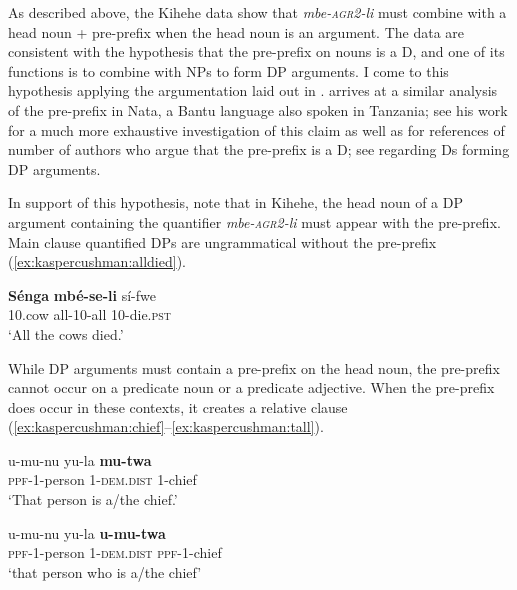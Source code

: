 \documentclass[output=paper,modfonts,nonflat]{langsci/langscibook}
\begin{document}
As described above, the Kihehe data show that \textit{mbe-\textsc{agr2}-li} must combine with a head noun + pre-prefix when the head noun is an argument. The data are consistent with the hypothesis that the pre-prefix on nouns is a D, and one of its functions is to combine with NPs to form DP arguments. I come to this hypothesis applying the argumentation laid out in \citealt{matthewson01}. \citealt{gambarage16} arrives at a similar analysis of the pre-prefix in Nata, a Bantu language also spoken in Tanzania; see his work for a much more exhaustive investigation of this claim as well as for references of number of authors who argue that the pre-prefix is a D; see \citealt{longobardi94} regarding Ds forming DP arguments.

In support of this hypothesis, note that in Kihehe, the head noun of a DP argument containing the quantifier \textit{mbe-\textsc{agr2}-li} must appear with the pre-prefix. Main clause quantified DPs are ungrammatical without the pre-prefix (\ref{ex:kaspercushman:alldied}).

\begin{exe}

\ex \label{ex:kaspercushman:alldied} 
\gll * \textbf{Sénga} \textbf{mbé-se-li} sí-fwe \label{ex:kaspercushman:allcowsnoppf2}\\ 
{} 10.cow all-10-all 10-die.\textsc{pst} \\
\glt `All the cows died.' 

\end{exe}

While DP arguments must contain a pre-prefix on the head noun, the pre-prefix cannot occur on a predicate noun or a predicate adjective. When the pre-prefix does occur in these contexts, it creates a relative clause (\ref{ex:kaspercushman:chief}--\ref{ex:kaspercushman:tall}). 

\begin{exe}
\ex \label{ex:kaspercushman:chief} \begin{xlist}

\ex 
\gll u-mu-nu yu-la \textbf{mu-twa} \\
\textsc{ppf}-1-person 1-\textsc{dem.dist} 1-chief \\
\glt `That person is a/the chief.'


\ex 
\gll u-mu-nu yu-la \textbf{u-mu-twa} \\
\textsc{ppf}-1-person 1-\textsc{dem.dist} \textsc{ppf}-1-chief \\
\glt `that person who is a/the chief'

\end{xlist}
\end{exe}
\end{document}
